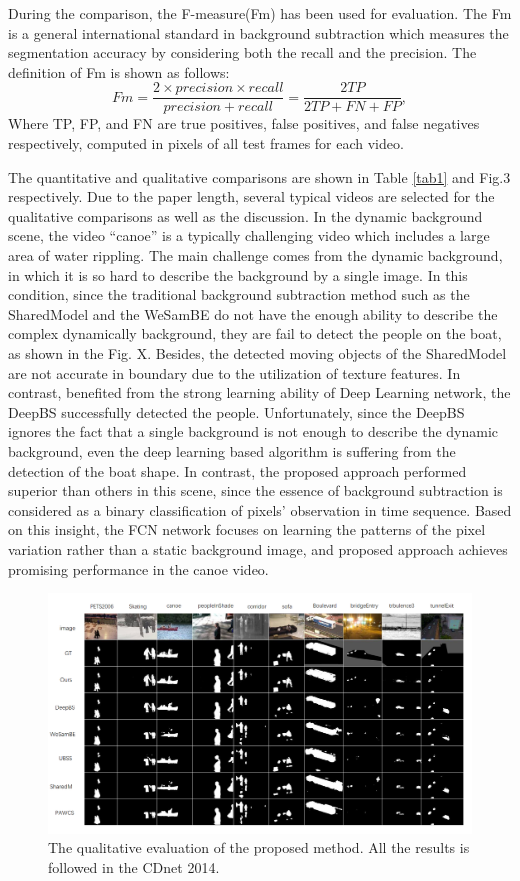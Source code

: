 \documentclass[runningheads,a4paper]{llncs}
\newcommand{\reftab}[1]{Table \ref{#1}}
\begin{document}
During the comparison, the F-measure(Fm) has been used for evaluation. The Fm is a general international standard in background subtraction which measures the segmentation accuracy by considering both the recall and the precision. The definition of Fm is shown as follows:
\begin{equation}
Fm= \frac{2\times precision \times recall}{precision + recall} = \frac{2TP}{2TP+FN+FP},
\end{equation}
Where TP, FP, and FN are true positives, false positives, and false negatives respectively, computed in pixels of all test frames for each video. 

The quantitative and qualitative comparisons are shown in \reftab{tab1} and Fig.3 respectively. Due to the paper length, several typical videos are selected for the qualitative comparisons as well as the discussion. In the dynamic background scene, the video “canoe” is a typically challenging video which includes a large area of water rippling. The main challenge comes from the dynamic background, in which it is so hard to describe the background by a single image. In this condition, since the traditional background subtraction method such as the SharedModel and the WeSamBE do not have the enough ability to describe the complex dynamically background, they are fail to detect the people on the boat, as shown in the Fig. X. Besides, the detected moving objects of the SharedModel are not accurate in boundary due to the utilization of texture features. In contrast, benefited from the strong learning ability of Deep Learning network, the DeepBS successfully detected the people. Unfortunately, since the DeepBS ignores the fact that a single background is not enough to describe the dynamic background, even the deep learning based algorithm is suffering from the detection of the boat shape. In contrast, the proposed approach performed superior than others in this scene, since the essence of background subtraction is considered as a binary classification of pixels’ observation in time sequence. Based on this insight, the FCN network focuses on learning the patterns of the pixel variation rather than a static background image, and proposed approach achieves promising performance in the canoe video.
\begin{figure}
    \centering
    \includegraphics[width=\textwidth]{figure/fig3}
    \caption{The qualitative evaluation of the proposed method. All the results is followed in the CDnet 2014.}
    \label{results_chart}
\end{figure}
\end{document}
